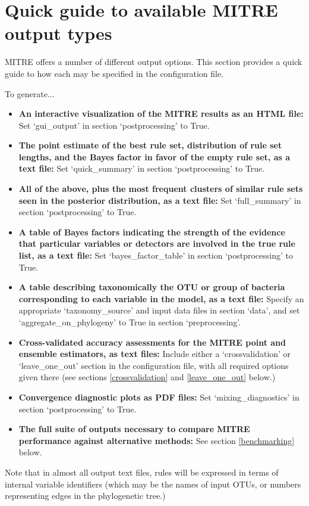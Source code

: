 \documentclass[12pt]{report}
\begin{document}
\chapter{Quick guide to available MITRE output types}
MITRE offers a number of different output options. This section
provides a quick guide to how each may be specified in the configuration
file.

To generate...
\begin{itemize}
\item \textbf{An interactive visualization of the MITRE results as an
  HTML file:} Set `gui\_output' in section `postprocessing' to True.
\item \textbf{The point estimate of the best rule set, distribution of
  rule set lengths, and the Bayes factor in favor of the empty rule
  set, as a text file:} Set `quick\_summary' in section
  `postprocessing' to True.
\item \textbf{All of the above, plus the most frequent clusters of
  similar rule sets seen in the posterior distribution, as a text
  file:} Set `full\_summary' in section `postprocessing' to True.
\item \textbf{A table of Bayes factors indicating the strength of the
  evidence that particular variables or detectors are involved in the
  true rule list, as a text file:} Set `bayes\_factor\_table' in
  section `postprocessing' to True.
\item \textbf{A table describing taxonomically the OTU or group of
  bacteria corresponding to each variable in the model, as a text
  file:} Specify an appropriate `taxonomy\_source' and input data
  files in section `data', and set `aggregate\_on\_phylogeny' to True
  in section `preprocessing'.
\item \textbf{Cross-validated accuracy assessments for the MITRE point
  and ensemble estimators, as text files:} Include either a `crossvalidation' or
  `leave\_one\_out' section in the configuration file, with all
  required options given there (see sections \ref{crossvalidation} and
  \ref{leave_one_out} below.)
\item \textbf{Convergence diagnostic plots as PDF files:} Set
  `mixing\_diagnostics' in section `postprocessing' to True.
\item \textbf{The full suite of outputs necessary to compare MITRE
  performance against alternative methods:} See section
  \ref{benchmarking} below.
\end{itemize}  

Note that in almost all output text files, rules will be expressed in
terms of internal variable identifiers (which may be the names of
input OTUs, or numbers representing edges in the phylogenetic tree.)
\end{document}
